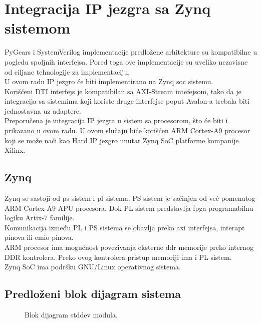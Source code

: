 \section{Integracija IP jezgra sa Zynq sistemom}

PyGears i SystemVerilog implementacije predložene arhitekture su kompatibilne u
pogledu spoljnih interfejsa.
Pored toga ove implementacije su uveliko nezavisne od ciljane tehnologije za
implementaciju. \\
U ovom radu IP jezgro će biti implementirano na Zynq \gls{soc} sistemu. \\

Korišćeni DTI interfejs je kompatibilan sa AXI-Stream intefejsom, tako da je
integracija sa sistemima koji koriste druge interfejse poput Avalon-a trebala
biti jednostavna uz adaptere. \\

Preporučena je integracija IP jezgra u sistem sa procesorom, što će biti i
prikazano u ovom radu.
U ovom slučaju biće korišćen ARM Cortex-A9 procesor koji se može naći kao Hard
IP jezgro unutar Zynq SoC platforme kompanije Xilinx. \\

\subsection{Zynq}

Zynq se sastoji od \gls{ps} sistem i \gls{pl} sistema.
PS sistem je sačinjen od već pomenutog ARM Cortex-A9 \gls{APU} procesora.
Dok PL sistem predstavlja \gls{fpga} programabilnu logiku Artix-7 familije. \\

Komunikacija između PL i PS sistema se obavlja preko \gls{axi} interfejsa,
interapt pinova ili \gls{emio} pinova.\\

ARM procesor ima mogućnost povezivanja eksterne \gls{ddr} memorije preko
internog DDR kontrolera.
Preko ovog kontrolera pristup memoriji ima i PL sistem. \\
Zynq SoC ima podršku GNU/Linux operativnog sistema.

\subsection{Predloženi blok dijagram sistema}


\begin{figure}[H]
  \centering
  \resizebox{1\textwidth}{!}{%
    
  }
  \caption{Blok dijagram stddev modula.}
  \label{stddev_bd}
\end{figure}